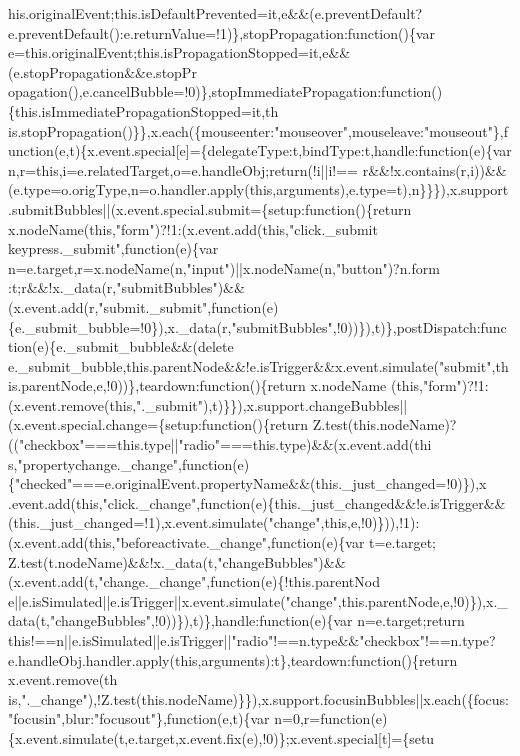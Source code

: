 \begin{DoxyCode}
{      his.originalEvent;this.isDefaultPrevented=it,e&&(e.preventDefault?e.preventDefault():e.returnValue=!1)\},stopPropagation:function()\{var
       e=this.originalEvent;this.isPropagationStopped=it,e&&(e.stopPropagation&&e.stopPr
      opagation(),e.cancelBubble=!0)\},stopImmediatePropagation:function()\{this.isImmediatePropagationStopped=it,th
      is.stopPropagation()\}\},x.each(\{mouseenter:"mouseover",mouseleave:"mouseout"\},function(e,t)\{x.event.special[e]=\{delegateType:t,bindType:t,handle:function(e)\{var
       n,r=this,i=e.relatedTarget,o=e.handleObj;return(!i||i!==
      r&&!x.contains(r,i))&&(e.type=o.origType,n=o.handler.apply(this,arguments),e.type=t),n\}\}\}),x.support.submitBubbles||(x.event.special.submit=\{setup:function()\{return
       x.nodeName(this,"form")?!1:(x.event.add(this,"click.\_submit keypress.\_submit",function(e)\{var
       n=e.target,r=x.nodeName(n,"input")||x.nodeName(n,"button")?n.form
      :t;r&&!x.\_data(r,"submitBubbles")&&(x.event.add(r,"submit.\_submit",function(e)\{e.\_submit\_bubble=!0\}),x.\_data(r,"submitBubbles",!0))\}),t)\},postDispatch:function(e)\{e.\_submit\_bubble&&(delete
       e.\_submit\_bubble,this.parentNode&&!e.isTrigger&&x.event.simulate("submit",this.parentNode,e,!0))\},teardown:function()\{return
       x.nodeName
      (this,"form")?!1:(x.event.remove(this,".\_submit"),t)\}\}),x.support.changeBubbles||(x.event.special.change=\{setup:function()\{return
       Z.test(this.nodeName)?(("checkbox"===this.type||"radio"===this.type)&&(x.event.add(thi
      s,"propertychange.\_change",function(e)\{"checked"===e.originalEvent.propertyName&&(this.\_just\_changed=!0)\}),x
      .event.add(this,"click.\_change",function(e)\{this.\_just\_changed&&!e.isTrigger&&(this.\_just\_changed=!1),x.event.simulate("change",this,e,!0)\})),!1):(x.event.add(this,"beforeactivate.\_change",function(e)\{var
       t=e.target;
      Z.test(t.nodeName)&&!x.\_data(t,"changeBubbles")&&(x.event.add(t,"change.\_change",function(e)\{!this.parentNod
      e||e.isSimulated||e.isTrigger||x.event.simulate("change",this.parentNode,e,!0)\}),x.\_data(t,"changeBubbles",!0))\}),t)\},handle:function(e)\{var n=e.target;return
       this!==n||e.isSimulated||e.isTrigger||"radio"!==n.type&&"checkbox"!==n.type?e.handleObj.handler.apply(this,arguments):t\},teardown:function()\{return
       x.event.remove(th
      is,".\_change"),!Z.test(this.nodeName)\}\}),x.support.focusinBubbles||x.each(\{focus:"focusin",blur:"focusout"\},function(e,t)\{var
       n=0,r=function(e)\{x.event.simulate(t,e.target,x.event.fix(e),!0)\};x.event.special[t]=\{setu
}
\end{DoxyCode}
